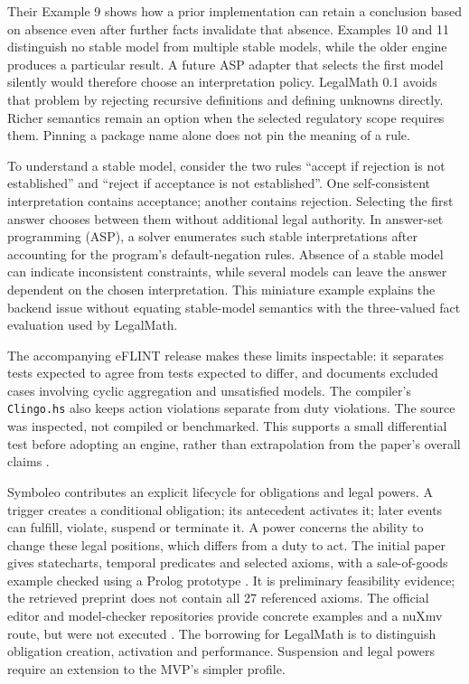 \documentclass[12pt,a4paper,oneside,openany]{book}
\begin{document}
Their Example 9 shows how a prior implementation can retain a conclusion based
on absence even after further facts invalidate that absence. Examples 10 and 11
distinguish no stable model from multiple stable models, while the older engine
produces a particular result. A future ASP adapter that selects the first model
silently would therefore choose an interpretation policy. LegalMath 0.1 avoids
that problem by rejecting recursive definitions and defining unknowns directly.
Richer semantics remain an option when the selected regulatory scope requires
them. Pinning a package name alone does not pin the meaning of a rule.

To understand a stable model, consider the two rules ``accept if rejection is
not established'' and ``reject if acceptance is not established''. One
self-consistent interpretation contains acceptance; another contains rejection.
Selecting the first answer chooses between them without additional legal
authority. In answer-set programming (ASP), a solver enumerates such stable
interpretations after accounting for the program's default-negation rules.
Absence of a stable model can indicate inconsistent constraints, while several models can leave
the answer dependent on the chosen interpretation. This miniature example
explains the backend issue without equating stable-model semantics with the
three-valued fact evaluation used by LegalMath.

The accompanying eFLINT release makes these limits inspectable: it separates
tests expected to agree from tests expected to differ, and documents excluded
cases involving cyclic aggregation and unsatisfied models. The compiler's
\texttt{Clingo.hs} also keeps action violations separate from duty violations.
The source was inspected, not compiled or benchmarked. This supports a small
differential test before adopting an engine, rather than extrapolation from the
paper's overall claims \citep{eflintartifact}.

Symboleo contributes an explicit lifecycle for obligations and legal powers.
A trigger creates a conditional obligation; its antecedent activates it; later
events can fulfill, violate, suspend or terminate it. A power concerns the ability
to change these legal positions, which differs from a duty to act. The initial
paper gives statecharts, temporal predicates and selected axioms, with a
sale-of-goods example checked using a Prolog prototype
\citep[secs.~III--IV]{symboleo2020}. It is preliminary feasibility evidence;
the retrieved preprint does not contain all 27 referenced axioms. The official
editor and model-checker repositories provide concrete examples and a nuXmv
route, but were not executed \citep{symboleocode}. The borrowing for LegalMath
is to distinguish obligation creation, activation and performance. Suspension
and legal powers require an extension to the MVP's simpler profile.
\end{document}
